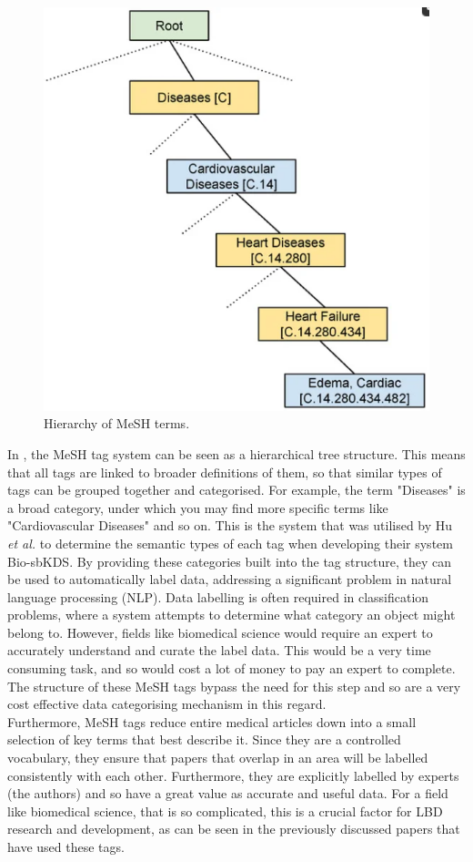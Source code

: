 \documentclass{l4proj}
\begin{document}
\begin{figure}[h]
    \centering
    \includegraphics[width=0.6\linewidth]{images/mesh_label.png}
    \caption{Hierarchy of MeSH terms. \citep{silvestri_integrating_2023}}
    \label{fig:mesh}
\end{figure}

In , the MeSH tag system can be seen as a hierarchical tree structure. This means that all tags are linked to broader definitions of them, so that similar types of tags can be grouped together and categorised. For example, the term "Diseases" is a broad category, under which you may find more specific terms like "Cardiovascular Diseases" and so on. This is the system that was utilised by Hu \textit{et al.} to determine the semantic types of each tag when developing their system Bio-sbKDS. By providing these categories built into the tag structure, they can be used to automatically label data, addressing a significant problem in natural language processing (NLP). Data labelling is often required in classification problems, where a system attempts to determine what category an object might belong to. However, fields like biomedical science would require an expert to accurately understand and curate the label data. This would be a very time consuming task, and so would cost a lot of money to pay an expert to complete. The structure of these MeSH tags bypass the need for this step and so are a very cost effective data categorising mechanism in this regard.\\

Furthermore, MeSH tags reduce entire medical articles down into a small selection of key terms that best describe it. Since they are a controlled vocabulary, they ensure that papers that overlap in an area will be labelled consistently with each other. Furthermore, they are explicitly labelled by experts (the authors) and so have a great value as accurate and useful data. For a field like biomedical science, that is so complicated, this is a crucial factor for LBD research and development, as can be seen in the previously discussed papers that have used these tags. \\
\end{document}
